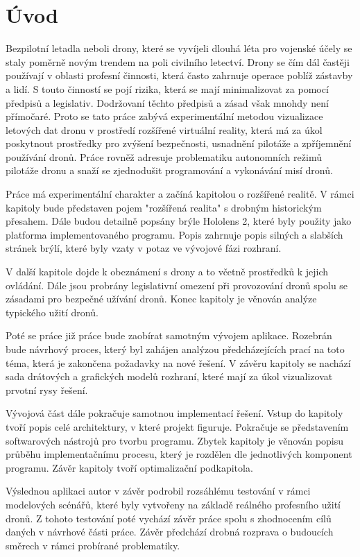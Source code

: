 
\chapter{Úvod}
Bezpilotní letadla neboli drony, které se vyvíjeli dlouhá léta pro vojenské účely se staly poměrně novým trendem na poli civilního letectví. Drony se čím dál častěji používají v oblasti profesní činnosti, která často zahrnuje operace poblíž zástavby a lidí. S touto činností se pojí rizika, která se mají minimalizovat za pomocí předpisů a legislativ. Dodržovaní těchto předpisů a zásad však mnohdy není přímočaré. Proto se tato práce zabývá experimentální metodou vizualizace letových dat dronu v prostředí rozšířené virtuální reality, která má za úkol poskytnout prostředky pro zvýšení bezpečnosti, usnadnění pilotáže a zpříjemnění používání dronů. Práce rovněž adresuje problematiku autonomních režimů pilotáže dronu a snaží se zjednodušit programování a vykonávání misí dronů. 

Práce má experimentální charakter a začíná kapitolou o rozšířené realitě. V rámci kapitoly bude představen pojem "rozšířená realita" s drobným historickým přesahem. Dále budou detailně popsány brýle Hololens 2, které byly použity jako platforma implementovaného programu. Popis zahrnuje popis silných a slabších stránek brýlí, které byly vzaty v potaz ve vývojové fázi rozhraní. 

V další kapitole dojde k obeznámení s drony a to včetně prostředků k jejich ovládání. Dále jsou probrány legislativní omezení při provozování dronů spolu se zásadami pro bezpečné užívání dronů. Konec kapitoly je věnován analýze typického užití dronů. 

Poté se  práce již práce bude zaobírat samotným vývojem aplikace. Rozebrán bude návrhový proces, který byl zahájen analýzou předcházejících prací na toto téma, která je zakončena požadavky na nové řešení. V závěru kapitoly se nachází sada drátových a grafických modelů rozhraní, které mají za úkol vizualizovat prvotní rysy řešení. 

Vývojová část dále pokračuje samotnou implementací řešení. Vstup do kapitoly tvoří popis celé architektury, v které projekt figuruje. Pokračuje se představením softwarových nástrojů pro tvorbu programu. Zbytek kapitoly je věnován popisu průběhu implementačnímu procesu, který je rozdělen dle jednotlivých komponent programu. Závěr kapitoly tvoří optimalizační podkapitola.

Výslednou aplikaci autor v závěr podrobil rozsáhlému testování v rámci modelových scénářů, které byly vytvořeny na základě reálného profesního užití dronů. Z tohoto testování poté vychází závěr práce spolu s zhodnocením cílů daných v návrhové části práce. Závěr předchází drobná rozprava o budoucích směrech v rámci probírané problematiky.


